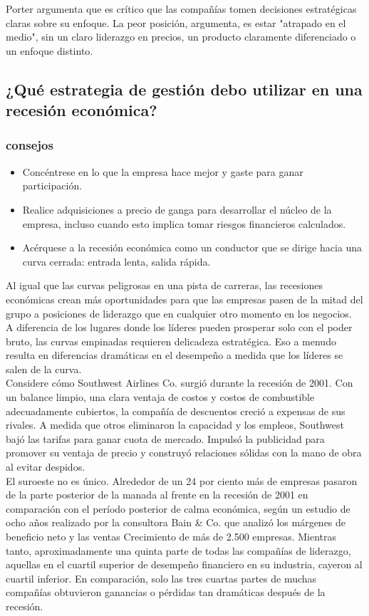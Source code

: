 \documentclass[10pt]{book}
\begin{document}
Porter argumenta que es crítico que las compañías tomen decisiones estratégicas claras sobre su enfoque. La peor posición, argumenta, es estar "atrapado en el medio", sin un claro liderazgo en precios, un producto claramente diferenciado o un enfoque distinto.  
\subsection{¿Qué estrategia de gestión debo utilizar en una recesión económica?}
\subsubsection{consejos}
\begin{itemize}
\item Concéntrese en lo que la empresa hace mejor y gaste para ganar participación.
\item Realice adquisiciones a precio de ganga para desarrollar el núcleo de la empresa, incluso cuando esto implica tomar riesgos financieros calculados.
\item Acérquese a la recesión económica como un conductor que se dirige hacia una curva cerrada: entrada lenta, salida rápida.
\end{itemize}
Al igual que las curvas peligrosas en una pista de carreras, las recesiones económicas crean más oportunidades para que las empresas pasen de la mitad del grupo a posiciones de liderazgo que en cualquier otro momento en los negocios.\\
A diferencia de los lugares donde los líderes pueden prosperar solo con el poder bruto, las curvas empinadas requieren delicadeza estratégica. Eso a menudo resulta en diferencias dramáticas en el desempeño a medida que los líderes se salen de la curva.\\
Considere cómo Southwest Airlines Co. surgió durante la recesión de 2001. Con un balance limpio, una clara ventaja de costos y costos de combustible adecuadamente cubiertos, la compañía de descuentos creció a expensas de sus rivales. A medida que otros eliminaron la capacidad y los empleos, Southwest bajó las tarifas para ganar cuota de mercado. Impulsó la publicidad para promover su ventaja de precio y construyó relaciones sólidas con la mano de obra al evitar despidos.\\
El suroeste no es único. Alrededor de un 24 por ciento más de empresas pasaron de la parte posterior de la manada al frente en la recesión de 2001 en comparación con el período posterior de calma económica, según un estudio de ocho años realizado por la consultora Bain \& Co. que analizó los márgenes de beneficio neto y las ventas Crecimiento de más de 2.500 empresas. Mientras tanto, aproximadamente una quinta parte de todas las compañías de liderazgo, aquellas en el cuartil superior de desempeño financiero en su industria, cayeron al cuartil inferior. En comparación, solo las tres cuartas partes de muchas compañías obtuvieron ganancias o pérdidas tan dramáticas después de la recesión.\\
\end{document}

